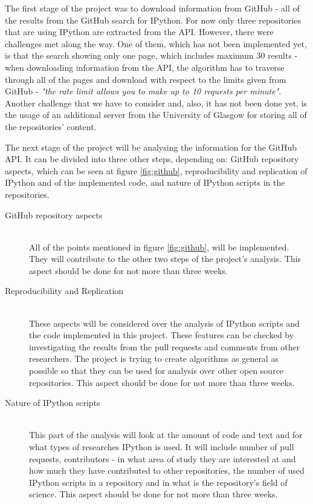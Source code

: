 
The first stage of the project was to download information from GitHub - all of the results from the GitHub search for IPython.\cite{gitHubAPI} For now only three repositories that are using IPython are extracted from the API. However, there were challenges met along the way. One of them, which has not been implemented yet, is that the search showing only one page, which includes maximum 30 results - when downloading information from the API, the algorithm has to traverse through all of the pages and download with respect to the limits given from GitHub - \textit{"the rate limit allows you to make up to 10 requests per minute"}\cite{traverseGitHub}. Another challenge that we have to consider and, also, it has not been done yet, is the usage of an additional server from the University of Glasgow for storing all of the repositories' content. 

The next stage of the project will be analysing the information for the GitHub API. It can be divided into three other steps, depending on: GitHub repository aspects, which can be seen at figure \ref{fig:github}, reproducibility and replication of IPython and of the implemented code, and nature of IPython scripts in the repositories. 

\begin{description}
\item[GitHub repository aspects] \hfill \\ All of the points mentioned in figure \ref{fig:github}, will be implemented. They will contribute to the other two steps of the project's analysis. This aspect should be done for not more than three weeks. 

\item[Reproducibility and Replication] \hfill \\ These aspects will be considered over the analysis of IPython scripts and the code implemented in this project. These features can be checked by investigating the results from the pull requests and comments from other researchers. The project is trying to create algorithms as general as possible so that they can be used for analysis over other open source repositories. This aspect should be done for not more than three weeks. 

\item[Nature of IPython scripts] \hfill \\ This part of the analysis will look at the amount of code and text and for what types of researches IPython is used. It will include number of pull requests, contributors - in what area of study they are interested at and how much they have contributed to other repositories, the number of used IPython scripts in a repository and in what is the repository's field of science. This aspect should be done for not more than three weeks. 
\end{description}

